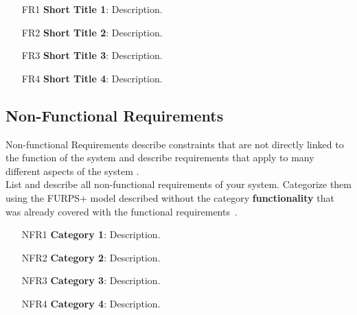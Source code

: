 \begin{itemize}[itemindent=-4pt, leftmargin=34pt, align=left]
    \item[FR1] \textbf{Short Title 1}: Description.
    \item[FR2] \textbf{Short Title 2}: Description.
    \item[FR3] \textbf{Short Title 3}: Description.
    \item[FR4] \textbf{Short Title 4}: Description.
\end{itemize}


\subsection*{Non-Functional Requirements}

\begin{tcolorbox}
	Non-functional Requirements describe constraints that are not directly linked to the function of the system and describe requirements that apply to many different aspects of the system \cite{bruegge2013object}.
	\\
	List and describe all non-functional requirements of your system.
	Categorize them using the FURPS+ model described without the category \textbf{functionality} that was already covered with the functional requirements~\cite{bruegge2013object}. 
\end{tcolorbox}

\begin{itemize}[itemindent=-13pt, leftmargin=43pt, align=left]
    \item[NFR1] \textbf{Category 1}: Description.
    \item[NFR2] \textbf{Category 2}: Description.
    \item[NFR3] \textbf{Category 3}: Description.
    \item[NFR4] \textbf{Category 4}: Description.
\end{itemize}


